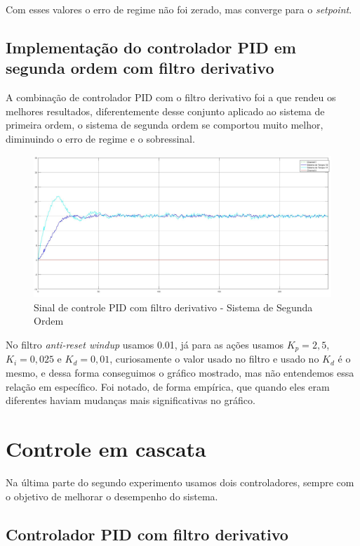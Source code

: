 \documentclass[
	12pt,				%
	openany,			%
	oneside,			%
	a4paper,			%
	english,			%
	french,				%
	spanish,			%
	brazil,				%
	]{abntex2}
\begin{document}
{Com esses valores o erro de regime não foi zerado, mas converge para o \textit{setpoint}.

\subsection{Implementação do controlador PID em segunda ordem com filtro derivativo}

A combinação de controlador PID com o filtro derivativo foi a que rendeu os melhores resultados, diferentemente desse conjunto aplicado ao sistema de primeira ordem, o sistema de segunda ordem se comportou muito melhor, diminuindo o erro de regime e o sobressinal.

\begin{figure}[h]
	\centering
	\includegraphics[scale=0.25]{12 - pid_segunda_ordem_filtro.jpg}
	\caption{Sinal de controle PID com filtro derivativo - Sistema de Segunda Ordem}
\end{figure}

No filtro \textit{anti-reset windup} usamos 0.01, já para as ações usamos $K_p=2,5$, $K_i=0,025$ e $K_d = 0,01$, curiosamente o valor usado no filtro e usado no $K_d$ é o mesmo, e dessa forma conseguimos o gráfico mostrado, mas não entendemos essa relação em específico. Foi notado, de forma empírica, que quando eles eram diferentes haviam mudanças mais significativas no gráfico. 

\section{Controle em cascata}

Na última parte do segundo experimento usamos dois controladores, sempre com o objetivo de melhorar o desempenho do sistema.

\subsection{Controlador PID com filtro derivativo }

}
\end{document}
